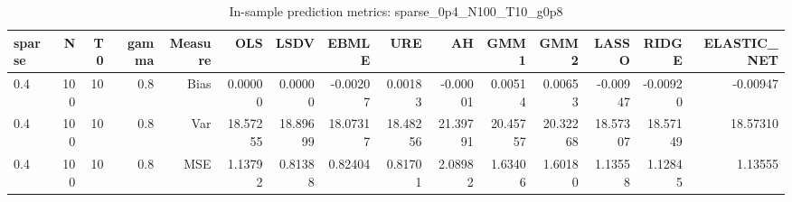 \begin{table}[!htbp]\centering
\caption{In-sample prediction metrics: sparse_0p4_N100_T10_g0p8}
\label{tab:table2_sparse_0p4_N100_T10_g0p8}
\begin{tabular}{lrrrrrrrrrrrrrr}
\hline
sparse & N & T0 & gamma & Measure & OLS & LSDV & EBMLE & URE & AH & GMM1 & GMM2 & LASSO & RIDGE & ELASTIC_NET \\
\hline
0.4 & 100 & 10 & 0.8 & Bias & 0.00000 & 0.00000 & -0.00207 & 0.00183 & -0.00001 & 0.00514 & 0.00653 & -0.00947 & -0.00920 & -0.00947 \\
0.4 & 100 & 10 & 0.8 & Var & 18.57255 & 18.89699 & 18.07317 & 18.48256 & 21.39791 & 20.45757 & 20.32268 & 18.57307 & 18.57149 & 18.57310 \\
0.4 & 100 & 10 & 0.8 & MSE & 1.13792 & 0.81388 & 0.82404 & 0.81701 & 2.08982 & 1.63406 & 1.60180 & 1.13558 & 1.12845 & 1.13555 \\
\hline
\end{tabular}
\end{table}

